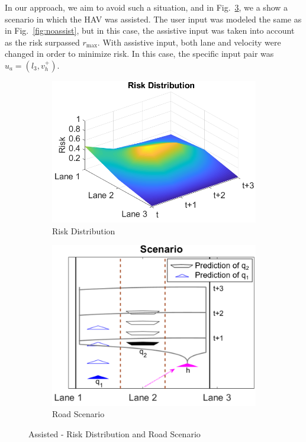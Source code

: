 \documentclass[letterpaper, 10 pt, conference]{ieeeconf}  %
\begin{document}
In our approach, we aim to avoid such a situation, and in Fig.~\ref{fig:assist}, we a show a scenario in which the HAV was assisted. The user input was modeled the same as in Fig.~\ref{fig:noassist}, but in this case, the assistive input was taken into account as the risk surpassed $r_{\max}$. With assistive input, both lane and velocity were changed in order to minimize risk. In this case, the specific input pair was $u_a = (l_3,v_h^+)$. 

\begin{figure}[h]
\centering
\begin{subfigure}{.54\linewidth}
  \centering
  \includegraphics[width=\linewidth]{fig/assist_rd.png}
  \caption{Risk Distribution}
  \label{fig:assistrd}
\end{subfigure}%
\begin{subfigure}{.46\linewidth}
  \centering
  \includegraphics[width=\linewidth]{fig/assist_rs.png}
  \caption{Road Scenario}
  \label{fig:assistrs}
\end{subfigure}
\caption{Assisted - Risk Distribution and Road Scenario} \label{fig:assist}
\end{figure}
\end{document}
